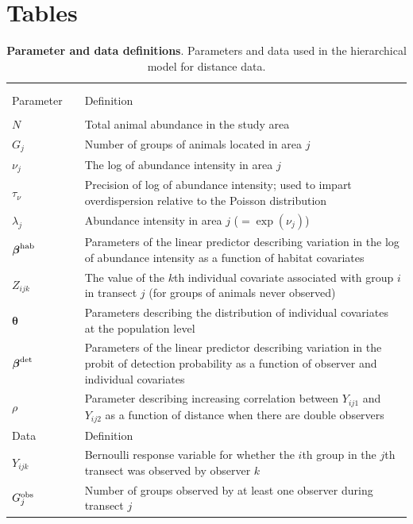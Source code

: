 \documentclass[10pt]{article}
\begin{document}
\section*{Tables}
\begin{table}
\caption{{\bf Parameter and data definitions}. Parameters and data used in the hierarchical model for distance data.}
\begin{tabular}{p{1.5cm}l p{12.5cm}}
\hline \hline \\
& & \\
Parameter & & Definition \\
\cline{1-1} \cline{3-3}
& & \\
$N$ & & Total animal abundance in the study area\\
$G_j$   & & Number of groups of animals located in area $j$\\
$\nu_{j}$ & & The log of abundance intensity in area $j$\\
$\tau_\nu$ & & Precision of log of abundance intensity; used to impart overdispersion relative to the Poisson distribution \\
$\lambda_{j}$ & & Abundance intensity in area $j$ ($=\exp(\nu_j)$)\\
$\boldsymbol{\beta}^{\rm hab}$ & & Parameters of the linear predictor describing variation in
        the log of abundance intensity as a function of habitat covariates\\
$Z_{ijk}$   & &  The value of the $k$th individual covariate associated with
    group $i$ in transect $j$ (for groups of animals never observed)\\
$\boldsymbol{\theta}$ & & Parameters describing the distribution of individual covariates
                          at the population level \\
$\boldsymbol{\beta}^{\rm det}$ & & Parameters of the linear predictor describing variation
        in the probit of detection probability as a function of observer and individual covariates \\
$\rho$ & & Parameter describing increasing correlation between $Y_{ij1}$ and $Y_{ij2}$ as a function of distance when there are double observers\\
Data & & Definition \\
\cline{1-1} \cline{3-3}
$Y_{ijk}$ &  & Bernoulli response variable for whether the $i$th group in the $j$th transect
                was observed by observer $k$\\
$G_j^{\rm obs}$ & & Number of groups observed by at least one observer during transect $j$\\

\end{tabular}
\end{table}
\end{document}
